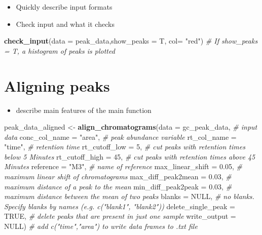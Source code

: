 \documentclass[]{article}
\newenvironment{Shaded}{}{}
\newcommand{\KeywordTok}[1]{\textbf{{#1}}}
\newcommand{\DataTypeTok}[1]{\textcolor[rgb]{0.50,0.00,0.00}{{#1}}}
\newcommand{\DecValTok}[1]{\textcolor[rgb]{0.00,0.00,1.00}{{#1}}}
\newcommand{\FloatTok}[1]{\textcolor[rgb]{0.50,0.00,0.50}{{#1}}}
\newcommand{\StringTok}[1]{\textcolor[rgb]{0.87,0.00,0.00}{{#1}}}
\newcommand{\CommentTok}[1]{\textcolor[rgb]{0.50,0.50,0.50}{\textit{{#1}}}}
\newcommand{\OtherTok}[1]{{#1}}
\newcommand{\NormalTok}[1]{{#1}}
\providecommand{\tightlist}{%
  \setlength{\itemsep}{0pt}\setlength{\parskip}{0pt}}
\begin{document}
\begin{itemize}
\tightlist
\item
  Quickly describe input formats
\item
  Check input and what it checks
\end{itemize}

\begin{Shaded}
\begin{Highlighting}[]
\KeywordTok{check_input}\NormalTok{(}\DataTypeTok{data =} \NormalTok{peak_data,}\DataTypeTok{show_peaks =} \NormalTok{T, }\DataTypeTok{col=} \StringTok{"red"}\NormalTok{) }\CommentTok{# If show_peaks = T, a histogram of peaks is plotted }
\end{Highlighting}
\end{Shaded}

\section{Aligning peaks}\label{aligning-peaks}

\begin{itemize}
\tightlist
\item
  describe main features of the main function
\end{itemize}

\begin{Shaded}
\begin{Highlighting}[]
\NormalTok{peak_data_aligned <-}\StringTok{ }\KeywordTok{align_chromatograms}\NormalTok{(}\DataTypeTok{data =} \NormalTok{gc_peak_data, }\CommentTok{# input data}
    \DataTypeTok{conc_col_name =} \StringTok{"area"}\NormalTok{, }\CommentTok{# peak abundance variable}
    \DataTypeTok{rt_col_name =} \StringTok{"time"}\NormalTok{, }\CommentTok{# retention time }
    \DataTypeTok{rt_cutoff_low =} \DecValTok{5}\NormalTok{, }\CommentTok{# cut peaks with retention times below 5 Minutes}
    \DataTypeTok{rt_cutoff_high =} \DecValTok{45}\NormalTok{, }\CommentTok{# cut peaks with retention times above 45 Minutes}
    \DataTypeTok{reference =} \StringTok{"M3"}\NormalTok{, }\CommentTok{# name of reference }
    \DataTypeTok{max_linear_shift =} \FloatTok{0.05}\NormalTok{, }\CommentTok{# maximum linear shift of chromatograms}
    \DataTypeTok{max_diff_peak2mean =} \FloatTok{0.03}\NormalTok{, }\CommentTok{# maximum distance of a peak to the mean}
    \DataTypeTok{min_diff_peak2peak =} \FloatTok{0.03}\NormalTok{, }\CommentTok{# maximum distance between the mean of two peaks}
    \DataTypeTok{blanks =} \OtherTok{NULL}\NormalTok{, }\CommentTok{# no blanks. Specify blanks by names (e.g. c("blank1", "blank2"))}
    \DataTypeTok{delete_single_peak =} \OtherTok{TRUE}\NormalTok{, }\CommentTok{# delete peaks that are present in just one sample }
    \DataTypeTok{write_output =} \OtherTok{NULL}\NormalTok{) }\CommentTok{# add c("time","area") to write data frames to .txt file}
\end{Highlighting}
\end{Shaded}
\end{document}
